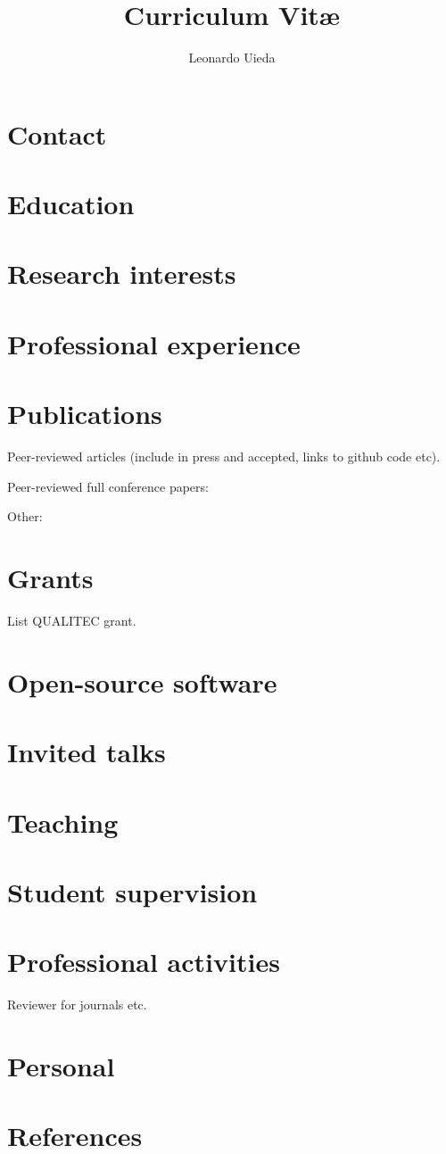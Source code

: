 \documentclass[10pt,helvetica,twocolumn]{article}
\begin{document}
\title{Curriculum Vit\ae}
\author{Leonardo Uieda}

\maketitle

\section{Contact}

\section{Education}

\section{Research interests}

\section{Professional experience}

\section{Publications}

Peer-reviewed articles (include in press and accepted, links to github code
etc).

Peer-reviewed full conference papers:

Other:


\section{Grants}

List QUALITEC grant.


\section{Open-source software}

\section{Invited talks}

\section{Teaching}

\section{Student supervision}

\section{Professional activities}

Reviewer for journals etc.

\section{Personal}

\section{References}
\end{document}
